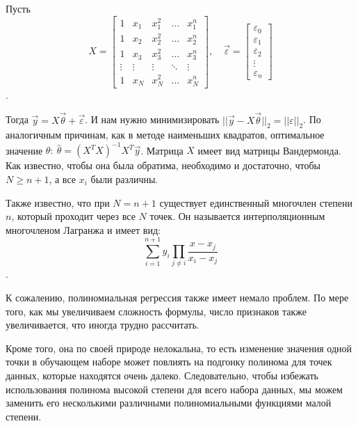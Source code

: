 Пусть $$X = {\begin{bmatrix}1&x_{1}&x_{1}^{2}&\dots &x_{1}^{n}\\1&x_{2}&x_{2}^{2}&\dots &x_{2}^{n}\\1&x_{3}&x_{3}^{2}&\dots &x_{3}^{n}\\\vdots &\vdots &\vdots &\ddots &\vdots \\1&x_{N}&x_{N}^{2}&\dots &x_{N}^{n}\end{bmatrix}}, \quad \vec{\varepsilon} = \begin{bmatrix}
        \varepsilon _{0} \\\varepsilon _{1}\\\varepsilon _{2}\\\vdots \\\varepsilon _{n}
    \end{bmatrix}$$.

Тогда $\vec{y}=X\vec{\theta}+\vec{\varepsilon}$. И нам нужно минимизировать $||\vec{y} - X\vec{\theta}||_2 = ||\varepsilon||_2$. По аналогичным причинам, как в методе наименьших квадратов, оптимальное значение $\theta:\ \hat{\theta} = (X^T X)^{-1} X^T \vec{y}$. Матрица $X$ имеет вид матрицы Вандермонда. Как известно, чтобы она была обратима, необходимо и достаточно, чтобы $N\geq n+1$, а все $x_i$ были различны.

Также известно, что при $N=n+1$ существует единственный многочлен степени $n$, который проходит через все $N$ точек. Он называется интерполяционным многочленом Лагранжа и имеет вид:
$$\sum\limits_{i=1}^{n+1} y_i \prod_{j\neq i}\frac{x-x_j}{x_i-x_j}$$.


К сожалению, полиномиальная регрессия также имеет немало проблем. По мере того, как мы увеличиваем сложность формулы, число признаков также увеличивается, что иногда трудно рассчитать.

Кроме того, она по своей природе нелокальна, то есть изменение значения одной точки в обучающем наборе может повлиять на подгонку полинома для точек данных, которые находятся очень далеко. Следовательно, чтобы избежать использования полинома высокой степени для всего набора данных, мы можем заменить его несколькими различными полиномиальными функциями малой степени.



